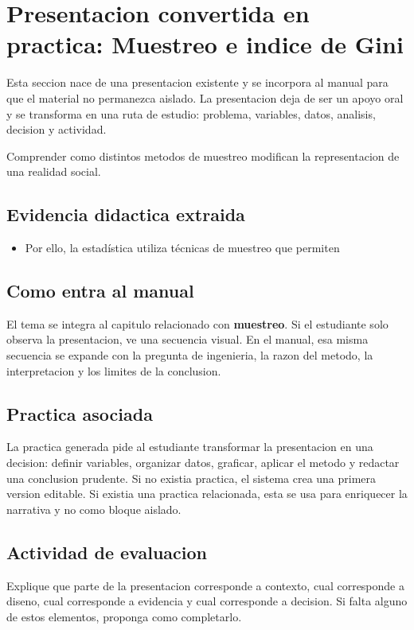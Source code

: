 \section{Presentacion convertida en practica: Muestreo e indice de Gini}

Esta seccion nace de una presentacion existente y se incorpora al manual para que el material no permanezca aislado. La presentacion deja de ser un apoyo oral y se transforma en una ruta de estudio: problema, variables, datos, analisis, decision y actividad.

\begin{idea}
Comprender como distintos metodos de muestreo modifican la representacion de una realidad social.
\end{idea}

\subsection{Evidencia didactica extraida}

\begin{itemize}
\item Por ello, la estadística utiliza técnicas de muestreo que permiten
\end{itemize}

\subsection{Como entra al manual}

El tema se integra al capitulo relacionado con \textbf{muestreo}. Si el estudiante solo observa la presentacion, ve una secuencia visual. En el manual, esa misma secuencia se expande con la pregunta de ingenieria, la razon del metodo, la interpretacion y los limites de la conclusion.

\subsection{Practica asociada}

La practica generada pide al estudiante transformar la presentacion en una decision: definir variables, organizar datos, graficar, aplicar el metodo y redactar una conclusion prudente. Si no existia practica, el sistema crea una primera version editable. Si existia una practica relacionada, esta se usa para enriquecer la narrativa y no como bloque aislado.

\subsection{Actividad de evaluacion}

Explique que parte de la presentacion corresponde a contexto, cual corresponde a diseno, cual corresponde a evidencia y cual corresponde a decision. Si falta alguno de estos elementos, proponga como completarlo.
